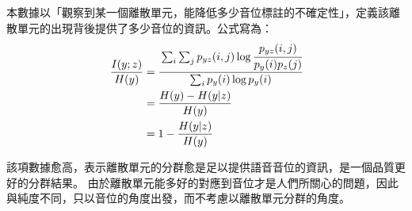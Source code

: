 本數據以「觀察到某一個離散單元，能降低多少音位標註的不確定性」，定義該離散單元的出現背後提供了多少音位的資訊。公式寫為：
\begin{align}
\frac{I(y;z)}{H(y)}&=\cfrac{\sum_i \sum_j p_{yz}(i, j) \log \cfrac{p_{yz}(i, j)}{p_y(i)p_z(j)}}{\sum_i p_y(i) \log p_y(i)} \\
&=\frac{H(y)-H(y|z)}{H(y)} \\
&=1-\frac{H(y|z)}{H(y)}
\end{align}

該項數據愈高，表示離散單元的分群愈是足以提供語音音位的資訊，是一個品質更好的分群結果。
由於離散單元能多好的對應到音位才是人們所關心的問題，因此與純度不同，只以音位的角度出發，而不考慮以離散單元分群的角度。


























